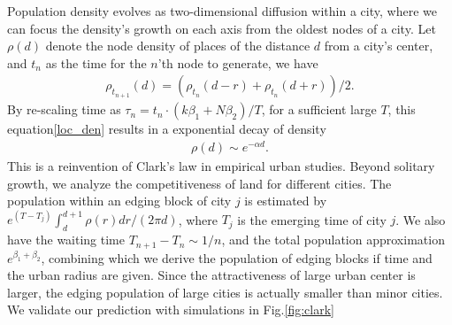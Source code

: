 \documentclass[reprint,unsortedaddress,amsmath,amssymb,aps,prl,showkeys]{revtex4-2}
\begin{document}

Population density evolves as two-dimensional diffusion within a city\cite{doi:10.1137/0150099}, where we can focus the density's growth on each axis from the oldest nodes of a city. Let $\rho(d)$ denote the node density of places of the distance $d$ from a city's center, and $t_n$ as the time for the $n$'th node to generate, we have 
\begin{align}
    \rho_{t_{n+1}}(d) = (\rho_{t_{n}}(d-r) + \rho_{t_{n}}(d+r) )/2.\label{loc_den}  
\end{align} By re-scaling time as $\tau_n = t_n\cdot (k\beta_1+N\beta_2)/T$, for a sufficient large $T$, this equation\@\ref{loc_den} results in a exponential decay of density
    \begin{align}
        \rho(d)\sim e^{-\alpha d}\label{clark_eq}.
    \end{align}
This is a reinvention of Clark's law in empirical urban studies\cite{clark1951urban}. Beyond solitary growth, we analyze the competitiveness of land for different cities. The population within an edging block of city $j$ is estimated by $e^{(T-T_j)}\int_{d}^{d+1}\rho(r)dr/(2\pi d)$, where $T_j$ is the emerging time of city $j$. We also have the waiting time $T_{n+1}-T_{n}\sim 1/n$, and the total population approximation $e^{\beta_1+\beta_2}$, combining which we derive the population of edging blocks if time and the urban radius are given. Since the attractiveness of large urban center is larger, the edging population of large cities is actually smaller than minor cities. We validate our prediction with simulations in Fig.\@\ref{fig:clark} %

\end{document}
